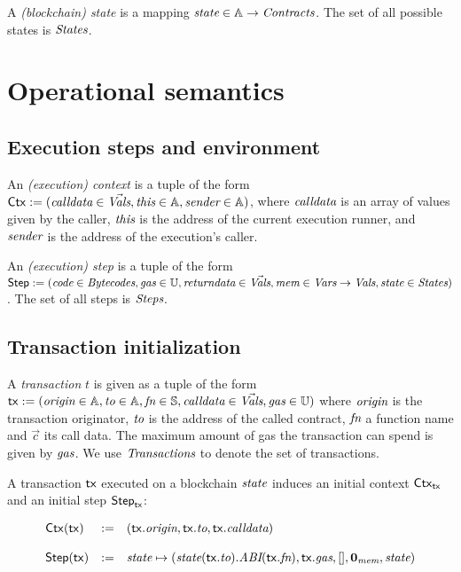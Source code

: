 \documentclass[12pt]{extarticle}
\begin{document}
A \emph{(blockchain) state} is a mapping $\textit{state}\in \mathbb{A}\to\textit{Contracts}$. The set of all possible states is $\textit{States}$.

\section{Operational semantics}

\subsection{Execution steps and environment}

An \emph{(execution) context} is a tuple of the form $\mathsf{Ctx}:=(\textit{calldata}\in\vec{\textit{Vals}},\textit{this}\in\mathbb{A},\textit{sender}\in\mathbb{A})$, 
where $\textit{calldata}$ is an array of values given by the caller, $\textit{this}$ is the address of the current execution runner, 
and $\textit{sender}$ is the address of the execution's caller. 

An \emph{(execution) step} is a tuple of the form
$\mathsf{Step}:=(
    \textit{code}\in\textit{Bytecodes},
    \textit{gas}\in\mathbb{U},
    \textit{returndata}\in\vec{\textit{Vals}}, 
    \textit{mem}\in\textit{Vars}\to\textit{Vals}, 
    \textit{state}\in\textit{States}
)$. The set of all steps is $\textit{Steps}$.

\subsection{Transaction initialization}
A \emph{transaction} $t$ is given as a tuple of the form $\mathsf{tx}:=(\textit{origin}\in\mathbb{A},\textit{to}\in\mathbb{A},\textit{fn}\in\mathbb{S},\textit{calldata}\in\vec {\textit{Vals}}, \textit{gas}\in\mathbb{U})$ where $\textit{origin}$ is the transaction originator, $\textit{to}$ is the address of the called contract, $\textit{fn}$ a function name and $\vec c$ its call data. The maximum amount of gas the transaction can spend is given by $\textit{gas}$.
We use $\textit{Transactions}$ to denote the set of transactions.

A transaction $\mathsf{tx}$ executed on a blockchain $\textit{state}$ induces an initial context $\mathsf{Ctx}_{\mathsf{tx}}$ and an initial step $\mathsf{Step}_{\mathsf{tx}}$:

$$ \begin{array} {lll}
\mathsf{Ctx}(\mathsf{tx}) &:=& (\mathsf{tx}.\textit{origin},\mathsf{tx}.\textit{to},\mathsf{tx}.\textit{calldata})\\\\
\mathsf{Step}(\mathsf{tx})&:=& \textit{state} \mapsto (\textit{state}(\mathsf{tx}.\textit{to}).\textit{ABI}(\mathsf{tx}.\textit{fn}),\mathsf{tx}.\textit{gas}, [],\mathbf{0}_{\textit{mem}},\textit{state})\\\\
\end{array}$$
\end{document}
